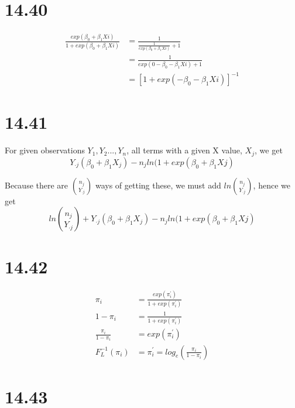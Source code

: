 \documentclass{article}\usepackage[]{graphicx}\usepackage[]{color}
\begin{document}
\section{14.40}

\begin{displaymath}
\begin{split}
  \frac{exp(\beta_0+\beta_1 Xi)}{1+exp(\beta_0+\beta_1 Xi)} &= \frac{1}{\frac{1}{exp(\beta_0+\beta_1 Xi)}+1} \\
    &= \frac{1}{exp(0-\beta_0-\beta_1 Xi) + 1} \\
    &= [1+exp(-\beta_0-\beta_1 Xi)]^{-1}
\end{split}
\end{displaymath}

\section{14.41}

\qquad For given observations $Y_1,Y_2...,Y_n$, all terms with a given X value, $X_j$, we get $$Y_{\cdot j}(\beta_0+\beta_1 X_j)-n_j ln(1+exp(\beta_0+\beta_1 Xj)$$

Because there are $\binom{n_j}{Y_{\cdot j}}$ ways of getting these, we must add $ ln\binom{n_j}{Y_{\cdot j}}$, hence we get $$ln \binom{n_j}{Y_{\cdot j}} + Y_{\cdot j}(\beta_0+\beta_1 X_j)-n_j ln(1+exp(\beta_0+\beta_1 Xj)$$

\section{14.42}

\begin{displaymath}
\begin{split}
  \pi_i &= \frac{exp(\pi_i^{'})}{1+exp(\pi_i^{'})} \\
  1-\pi_i &= \frac{1}{1+exp(\pi_i^{'})} \\
  \frac{\pi_i}{1-\pi_i} &= exp(\pi_i^{'}) \\
  F_L^{-1}(\pi_i) &= \pi_i^{'} =  log_e( \frac{\pi_i}{1-\pi_i})
\end{split}
\end{displaymath}

\section{14.43}
\end{document}
